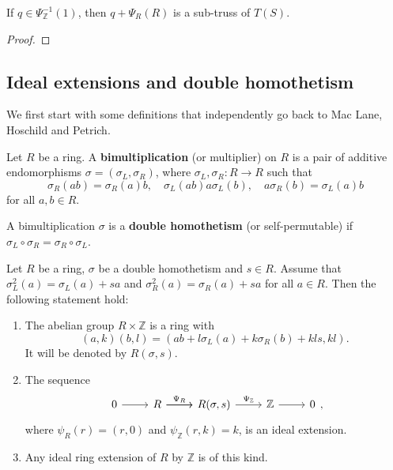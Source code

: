 \documentclass{svmult}
\newcommand{\Z}{\mathbb{Z}}
\begin{document}
\begin{proposition}
    If $q\in\Psi_{\Z}^{-1}(1)$, then 
    $q+\Psi_R(R)$ is a sub-truss of $T(S)$. 
\end{proposition}

\begin{proof}

\end{proof}

\subsection{Ideal extensions and double homothetism}

We first start with some definitions that independently 
go back to Mac Lane, Hoschild
and Petrich. 

\begin{definition}
Let $R$ be a ring. A \textbf{bimultiplication} (or multiplier) on $R$ is a pair of additive
endomorphisms $\sigma=(\sigma_L,\sigma_R)$, where 
$\sigma_L,\sigma_R\colon R\to R$ such that
\[
\sigma_R(ab)=\sigma_R(a)b,\quad
\sigma_L(ab)a\sigma_L(b),\quad
a\sigma_R(b)=\sigma_L(a)b
\]
for all $a,b\in R$. 
\end{definition}

\begin{definition}
    A bimultiplication $\sigma$ is a \textbf{double homothetism} (or self-permutable)
    if $\sigma_L\circ \sigma_R=\sigma_R\circ \sigma_L$.
\end{definition}

\begin{theorem}
    Let $R$ be a ring, $\sigma$ be a double homothetism and $s\in R$. 
    Assume that $\sigma_L^2(a)=\sigma_L(a)+sa$ and 
    $\sigma_R^2(a)=\sigma_R(a)+sa$ for all $a\in R$. 
    Then the following statement hold:
    \begin{enumerate}
        \item The abelian group $R\times\Z$ is a ring with
        \[
        (a,k)(b,l)=(ab+l\sigma_L(a)+k\sigma_R(b)+kls,kl).
        \]
        It will be denoted by $R(\sigma,s)$. 
        \item The sequence 
        \[
        \begin{tikzcd}
	    {0} & {R} & {R(\sigma,s)} & {\Z} & {0}
	    \arrow["{\Psi_R}", from=1-2, to=1-3]
	    \arrow[from=1-1, to=1-2]
	    \arrow[from=1-2, to=1-3]
	    \arrow["{\Psi_{\Z}}", from=1-3, to=1-4]
	    \arrow[from=1-4, to=1-5]
    \end{tikzcd},
    \]
    where $\psi_R(r)=(r,0)$ and $\psi_{\Z}(r,k)=k$, is an ideal extension. 
    \item Any ideal ring extension of $R$ by $\Z$ is of this kind. 
    \end{enumerate}
\end{theorem}
\end{document}

